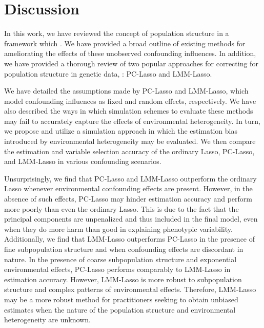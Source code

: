 \section{Discussion} \label{sec:discussion}

In this work, we have reviewed the concept of population structure in a framework which . We have provided a broad outline of existing methods for ameliorating the effects of these unobserved confounding influences. In addition, we have provided a thorough review of two popular approaches for correcting for population structure in genetic data, : PC-Lasso and LMM-Lasso. 

We have detailed the assumptions made by PC-Lasso and LMM-Lasso, which model confounding influences as fixed and random effects, respectively. We have also described the ways in which simulation schemes to evaluate these methods may fail to accurately capture the effects of environmental heterogeneity. In turn, we propose and utilize a simulation approach in which the estimation bias introduced by environmental heterogeneity may be evaluated. We then compare the estimation and variable selection accuracy of the ordinary Lasso, PC-Lasso, and LMM-Lasso in various confounding scenarios.

Unsurprisingly, we find that PC-Lasso and LMM-Lasso outperform the ordinary Lasso whenever environmental confounding effects are present. However, in the absence of such effects, PC-Lasso may hinder estimation accuracy and perform more poorly than even the ordinary Lasso. This is due to the fact that the principal components are unpenalized and thus included in the final model, even when they do more harm than good in explaining phenotypic variability. Additionally, we find that LMM-Lasso outperforms PC-Lasso in the presence of fine subpopulation structure and when confounding effects are discordant in nature. In the presence of coarse subpopulation structure and exponential environmental effects, PC-Lasso performs comparably to LMM-Lasso in estimation accuracy. However, LMM-Lasso is more robust to subpopulation structure and complex patterns of environmental effects. Therefore, LMM-Lasso may be a more robust method for practitioners seeking to obtain unbiased estimates when the nature of the population structure and environmental heterogeneity are unknown.  


